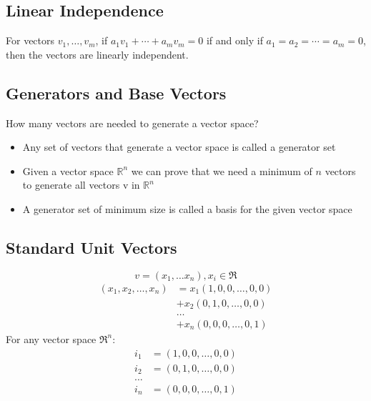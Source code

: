 \documentclass{article}
\newcommand{\R}{\mathbb{R}} %
\begin{document}
\subsection*{Linear Independence}
For vectors $v_1, \dots, v_m$, if $a_1 v_1 + \cdots + a_m v_m = 0$ if and only if $a_1 = a_2 = \cdots = a_m = 0$, then the vectors are linearly independent.

\subsection*{Generators and Base Vectors}
How many vectors are needed to generate a vector space?
\begin{itemize}
    \item Any set of vectors that generate a vector space is called a generator set
    \item Given a vector space $\R^n$ we can prove that we need a minimum of $n$ vectors to generate all vectors v in $\R^n$
    \item A generator set of minimum size is called a basis for the given vector space
\end{itemize}

\subsection*{Standard Unit Vectors}
\[v = (x_1, \dots x_n), x_i \in \mathfrak{R}\]
\begin{align*}
    (x_1, x_2, \dots, x_n) &= x_1(1, 0, 0, \dots, 0, 0) \\
    &+ x_2(0, 1, 0, \dots, 0, 0)\\
    &\dots\\
    &+ x_n(0, 0, 0, \dots, 0, 1)
\end{align*}
For any vector space $\mathfrak{R}^n$:
\begin{align*}
    i_1 &= (1, 0, 0, \dots, 0, 0)\\
    i_2 &= (0, 1, 0, \dots, 0, 0)\\
    \dots &\:\\
    i_n &= (0, 0, 0, \dots, 0, 1)
\end{align*}
\end{document}
